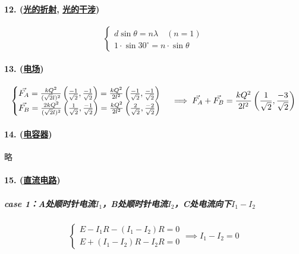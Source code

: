 \paragraph{12. (\hyperref[subsec:光的折射]{光的折射}, \hyperref[subsec:光的干涉]{光的干涉})}

\begin{equation*}
    \begin{cases}
        d\sin\theta=n\lambda\quad(n=1)\\
        1\cdot\sin30^\circ=n\cdot\sin\theta
    \end{cases}
\end{equation*}

\paragraph{13. (\hyperref[subsec:电场]{电场})}

\begin{equation*}
    \begin{cases}
        \vec{F_A}=\frac{kQ^2}{(\sqrt2l)^2}\left(\frac{-1}{\sqrt2},\frac{-1}{\sqrt2}\right)=\frac{kQ^2}{2l^2}\left(\frac{-1}{\sqrt2},\frac{-1}{\sqrt2}\right)\\
        \vec{F_B}=\frac{2kQ^2}{(\sqrt2l)^2}\left(\frac{1}{\sqrt2},\frac{-1}{\sqrt2}\right)=\frac{kQ^2}{2l^2}\left(\frac{2}{\sqrt2},\frac{-2}{\sqrt2}\right)
    \end{cases}\implies
    \vec{F_A}+\vec{F_B}=\frac{kQ^2}{2l^2}\left(\frac{1}{\sqrt2},\frac{-3}{\sqrt2}\right)\\
\end{equation*}

\paragraph{14. (\hyperref[subsec:电容器]{电容器})} 略

\paragraph{15. (\hyperref[subsec:直流电路]{直流电路})}

\subparagraph{case 1：A处顺时针电流$I_1$，B处顺时针电流$I_2$，C处电流向下$I_1-I_2$}
\begin{equation*}
    \begin{cases}
        E-I_1R-(I_1-I_2)R=0\\
        E+(I_1-I_2)R-I_2R=0
    \end{cases}\implies I_1-I_2=0
\end{equation*}


